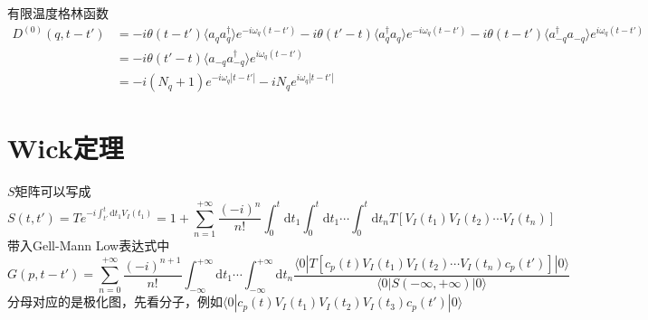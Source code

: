 \documentclass[a4paper,14pt]{article}
\begin{document}
\begin{enumerate}
    有限温度格林函数
    \begin{equation*}
        \begin{split}
            D^{(0)}(q,t-t')&=-i\theta(t-t')\langle a_q a_q^\dagger\rangle e^{-i\omega_q(t-t')}-i\theta(t'-t)\langle a_q^\dagger a_q\rangle e^{-i\omega_q(t-t')}-i\theta(t-t')\langle a_{-q}^\dagger a_{-q}\rangle e^{i\omega_q(t-t')}\\
            &=-i\theta(t'-t)\langle a_{-q}a_{-q}^\dagger\rangle e^{i\omega_q(t-t')}\\
            &=-i(N_q+1)e^{-i\omega_q|t-t'|}-iN_qe^{i\omega_q|t-t'|}
        \end{split}
    \end{equation*}
\end{enumerate}
\section{Wick定理}
$S$矩阵可以写成
\begin{equation*}
    S(t,t')=Te^{-i\int_{t'}^{t}\mathrm{d}t_1V_I(t_1)}=1+\sum_{n=1}^{+\infty}\frac{(-i)^n}{n!}\int_0^{t}\mathrm{d}t_1\int_0^{t}\mathrm{d}t_1\cdots\int_0^{t}\mathrm{d}t_nT[V_I(t_1)V_I(t_2)\cdots V_I(t_n)]
\end{equation*}
带入Gell-Mann Low表达式中
\begin{equation*}
    G(p,t-t')=\sum_{n=0}^{+\infty}\frac{(-i)^{n+1}}{n!}\int_{-\infty}^{+\infty}\mathrm{d}t_1\cdots\int_{-\infty}^{+\infty}\mathrm{d}t_n\frac{\langle0|T[c_p(t)V_I(t_1)V_I(t_2)\cdots V_I(t_n)c_p(t')]|0\rangle}{\langle0|S(-\infty,+\infty)|0\rangle}
\end{equation*}
分母对应的是极化图，先看分子，例如$\langle0|c_p(t)V_I(t_1)V_I(t_2)V_I(t_3)c_p(t')|0\rangle$
\end{document}
